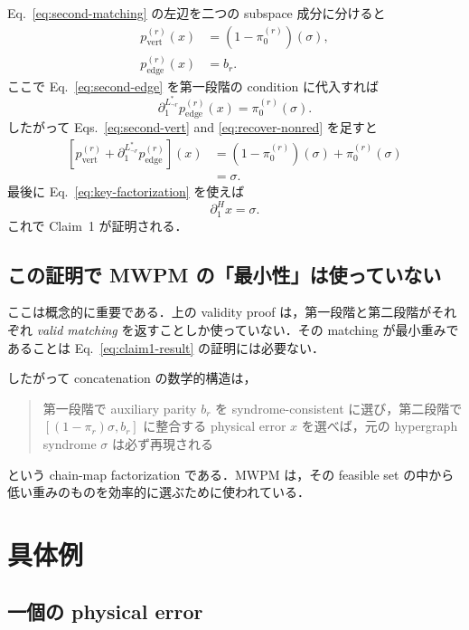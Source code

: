 \documentclass[a4paper,11pt]{ltjsarticle}
\newcommand{\bd}{\partial}
\begin{document}
Eq.~\eqref{eq:second-matching} の左辺を二つの subspace 成分に分けると
\begin{align}
 p_{\mathrm{vert}}^{(r)}(x)&=(1-\pi_0^{(r)})(\sigma),
 \label{eq:second-vert}\\
 p_{\mathrm{edge}}^{(r)}(x)&=b_r.
 \label{eq:second-edge}
\end{align}
ここで Eq.~\eqref{eq:second-edge} を第一段階の condition に代入すれば
\begin{equation}
 \bd_1^{L^*_{\neg r}}p_{\mathrm{edge}}^{(r)}(x)
 =\pi_0^{(r)}(\sigma).
 \label{eq:recover-nonred}
\end{equation}
したがって Eqs.~\eqref{eq:second-vert} and \eqref{eq:recover-nonred} を足すと
\begin{align}
 \left[p_{\mathrm{vert}}^{(r)}+\bd_1^{L^*_{\neg r}}p_{\mathrm{edge}}^{(r)}\right](x)
 &=(1-\pi_0^{(r)})(\sigma)+\pi_0^{(r)}(\sigma)\\
 &=\sigma.
 \label{eq:sum-syndrome}
\end{align}
最後に Eq.~\eqref{eq:key-factorization} を使えば
\begin{equation}
  \bd_1^H x=\sigma.
 \label{eq:claim1-result}
\end{equation}
これで Claim~1 が証明される．

\subsection{この証明で MWPM の「最小性」は使っていない}

ここは概念的に重要である．上の validity proof は，第一段階と第二段階がそれぞれ \emph{valid matching} を返すことしか使っていない．その matching が最小重みであることは Eq.~\eqref{eq:claim1-result} の証明には必要ない．

したがって concatenation の数学的構造は，
\begin{quote}
第一段階で auxiliary parity $b_r$ を syndrome-consistent に選び，第二段階で $[(1-\pi_r)\sigma,b_r]$ に整合する physical error $x$ を選べば，元の hypergraph syndrome $\sigma$ は必ず再現される
\end{quote}
という chain-map factorization である．MWPM は，その feasible set の中から低い重みのものを効率的に選ぶために使われている．

\section{具体例}
\subsection{一個の physical error}
\end{document}
